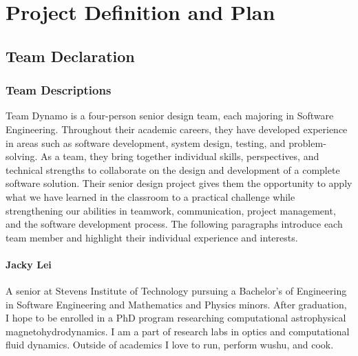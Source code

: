 
\part{Project Definition and Plan}

\chapter{Team Declaration}

\section{Team Descriptions}
Team Dynamo is a four-person senior design team, each majoring in Software Engineering. Throughout their academic careers, they have developed experience in areas such as software development, system design, testing, and problem-solving. As a team, they bring together individual skills, perspectives, and technical strengths to collaborate on the design and development of a complete software solution. Their senior design project gives them the opportunity to apply what we have learned in the classroom to a practical challenge while strengthening our abilities in teamwork, communication, project management, and the software development process. The following paragraphs introduce each team member and highlight their individual experience and interests.

\subsection{Jacky Lei}
A senior at Stevens Institute of Technology pursuing a Bachelor’s of Engineering in Software Engineering and Mathematics and Physics minors. After graduation, I hope to be enrolled in a PhD program researching computational astrophysical magnetohydrodynamics. I am a part of research labs in optics and computational fluid dynamics. Outside of academics I love to run, perform wushu, and cook.

